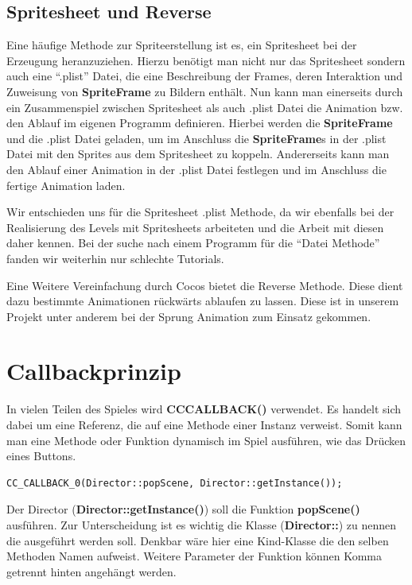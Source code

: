 \subsection{Spritesheet und Reverse}

Eine häufige Methode zur Spriteerstellung ist es, ein Spritesheet bei der Erzeugung heranzuziehen. 
Hierzu benötigt man nicht nur das Spritesheet sondern auch eine “.plist” Datei, die eine Beschreibung der Frames, deren Interaktion und Zuweisung von \textbf{SpriteFrame} zu Bildern enthält. Nun kann man einerseits durch ein Zusammenspiel zwischen Spritesheet als auch .plist Datei die Animation bzw. den Ablauf im eigenen Programm definieren. Hierbei werden die \textbf{SpriteFrame} und die .plist Datei geladen, um im Anschluss die \textbf{SpriteFrame}s in der .plist Datei mit den Sprites aus dem Spritesheet zu koppeln. Andererseits kann man den Ablauf einer Animation in der .plist Datei festlegen und im Anschluss die fertige Animation laden. 

Wir entschieden uns für die Spritesheet .plist Methode, da wir ebenfalls bei der Realisierung des Levels mit Spritesheets arbeiteten und die Arbeit mit diesen daher kennen. Bei der suche nach einem Programm für die “Datei Methode” fanden wir weiterhin nur schlechte Tutorials. 

Eine Weitere Vereinfachung durch Cocos bietet die Reverse Methode. Diese dient dazu bestimmte Animationen rückwärts ablaufen zu lassen. Diese ist in unserem Projekt unter anderem bei der Sprung Animation zum Einsatz gekommen. 

\section{Callbackprinzip}

In vielen Teilen des Spieles wird \textbf{CC\textunderscore CALLBACK()} verwendet. Es handelt sich dabei um eine Referenz, die auf eine Methode einer Instanz verweist. Somit kann man eine Methode oder Funktion dynamisch im Spiel ausführen, wie das Drücken eines Buttons.

\begin{lstlisting}[style=singleline]
CC_CALLBACK_0(Director::popScene, Director::getInstance());
\end{lstlisting}

Der Director (\textbf{Director::getInstance()}) soll die Funktion \textbf{popScene()} ausführen. Zur Unterscheidung ist es wichtig die Klasse (\textbf{Director::}) zu nennen die ausgeführt werden soll. Denkbar wäre hier eine Kind-Klasse die den selben Methoden Namen aufweist. 
Weitere Parameter der Funktion können Komma getrennt hinten angehängt werden.

